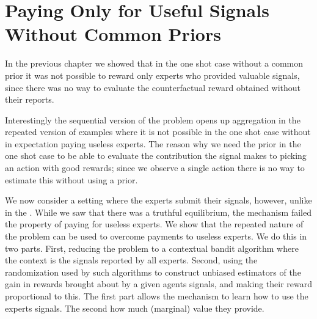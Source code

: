 




\section{Paying Only for Useful Signals Without Common Priors}

In the previous chapter we showed that in the one shot case without a common prior it was not possible to reward only experts who provided valuable signals, since there was no way to evaluate the counterfactual reward obtained without their reports. 

Interestingly the sequential version of the problem opens up aggregation in the repeated version of examples where it is not possible in the one shot case without in expectation paying useless experts. 
The reason why we need the prior in the one shot case to be able to evaluate the contribution the signal makes to picking an action with good rewards; since we observe a single action there is no way to estimate this without using a prior. 

We now consider a setting where the experts submit their signals, however, unlike in the .
 While we saw that there was a truthful equilibrium, the mechanism failed the property of paying for useless experts. We show that the repeated nature of the problem can be used to overcome payments to useless experts. 
We do this in two parts. First, reducing the problem to a contextual bandit algorithm where the context is the signals reported by all experts. Second, using the randomization used by such algorithms to construct unbiased estimators of the gain in rewards brought about by a given agents signals, and making their reward proportional to this.
The first part allows the mechanism to learn how to use the experts signals. The second how much (marginal) value they provide.

